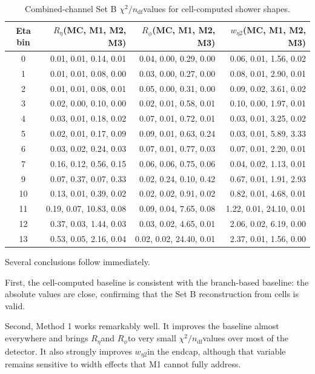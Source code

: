 \documentclass[11pt,a4paper]{article}
\newcommand{\Reta}{\ensuremath{R_{\eta}}}
\newcommand{\Rphi}{\ensuremath{R_{\phi}}}
\newcommand{\weta}{\ensuremath{w_{\eta 2}}}
\newcommand{\chisq}{\ensuremath{\chi^2 / n_{\mathrm{df}}}}
\begin{document}
\begin{table}[H]
\centering
\caption{Combined-channel Set B \chisq values for cell-computed shower shapes.}
\label{tab:setB-combined}
\begin{tabular}{crrr}
\toprule
Eta bin & \Reta (MC, M1, M2, M3) & \Rphi (MC, M1, M2, M3) & \weta (MC, M1, M2, M3) \\
\midrule
0  & 0.01, 0.01, 0.14, 0.01 & 0.04, 0.00, 0.29, 0.00 & 0.06, 0.01, 1.56, 0.02 \\
1  & 0.01, 0.01, 0.08, 0.00 & 0.03, 0.00, 0.27, 0.00 & 0.08, 0.01, 2.90, 0.01 \\
2  & 0.01, 0.01, 0.08, 0.01 & 0.05, 0.00, 0.31, 0.00 & 0.09, 0.02, 3.61, 0.02 \\
3  & 0.02, 0.00, 0.10, 0.00 & 0.02, 0.01, 0.58, 0.01 & 0.10, 0.00, 1.97, 0.01 \\
4  & 0.03, 0.01, 0.18, 0.02 & 0.07, 0.01, 0.72, 0.01 & 0.03, 0.01, 3.25, 0.02 \\
5  & 0.02, 0.01, 0.17, 0.09 & 0.09, 0.01, 0.63, 0.24 & 0.03, 0.01, 5.89, 3.33 \\
6  & 0.03, 0.02, 0.24, 0.03 & 0.07, 0.01, 0.77, 0.03 & 0.07, 0.01, 2.20, 0.01 \\
7  & 0.16, 0.12, 0.56, 0.15 & 0.06, 0.06, 0.75, 0.06 & 0.04, 0.02, 1.13, 0.01 \\
9  & 0.07, 0.37, 0.07, 0.33 & 0.02, 0.24, 0.10, 0.42 & 0.67, 0.01, 1.91, 2.93 \\
10 & 0.13, 0.01, 0.39, 0.02 & 0.02, 0.02, 0.91, 0.02 & 0.82, 0.01, 4.68, 0.01 \\
11 & 0.19, 0.07, 10.83, 0.08 & 0.09, 0.04, 7.65, 0.08 & 1.22, 0.01, 24.10, 0.01 \\
12 & 0.37, 0.03, 1.44, 0.03 & 0.03, 0.02, 4.65, 0.01 & 2.06, 0.02, 6.19, 0.00 \\
13 & 0.53, 0.05, 2.16, 0.04 & 0.02, 0.02, 24.40, 0.01 & 2.37, 0.01, 1.56, 0.00 \\
\bottomrule
\end{tabular}
\end{table}

Several conclusions follow immediately.

First, the cell-computed baseline is consistent with the branch-based baseline:
the absolute values are close, confirming that the Set B reconstruction from
cells is valid.

Second, Method 1 works remarkably well. It improves the baseline almost
everywhere and brings \Reta and \Rphi to very small \chisq values over most of
the detector. It also strongly improves \weta in the endcap, although that
variable remains sensitive to width effects that M1 cannot fully address.
\end{document}

